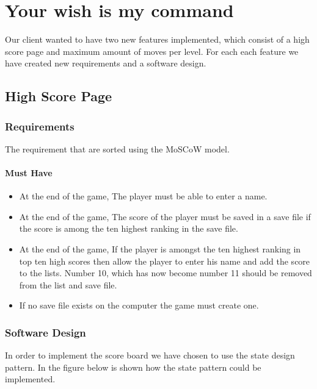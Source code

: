 \documentclass{article}
\begin{document}
\newpage
\section{Your wish is my command}
Our client wanted to have two new features implemented, which consist of a high score page and maximum amount of moves per level. For each each feature we have created new requirements and a software design.

\subsection{High Score Page} 

\subsubsection{Requirements}
The requirement that are sorted using the MoSCoW model.

\paragraph{Must Have}
\begin{itemize}
\item At the end of the game, The player must be able to enter a name.

\item At the end of the game, The score of the player must be saved in a save file if the score is among the ten highest ranking in the save file.

\item At the end of the game, If the player is amongst the ten highest ranking in top ten high scores then allow the player to enter his name and add the score to the lists. Number 10, which has now become number 11 should be removed from the list and save file.

\item If no save file exists on the computer the game must create one.
\end{itemize}



\subsubsection{Software Design}
In order to implement the score board we have chosen to use the state design pattern. In the figure below is shown how the state pattern could be implemented.
\end{document}
